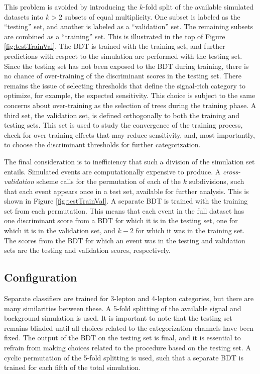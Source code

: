 This problem is avoided by introducing the $k$-fold split of the available simulated datasets into $k>2$ subsets of equal multiplicity.
One subset is labeled as the ``testing'' set, and another is labeled as a ``validation'' set.
The remaining subsets are combined as a ``training'' set.
This is illustrated in the top of Figure \ref{fig:testTrainVal}.
The BDT is trained with the training set, and further predictions with respect to the simulation are performed with the testing set.
Since the testing set has not been exposed to the BDT during training, there is no chance of over-training of the discriminant scores in the testing set.
There remains the issue of selecting thresholds that define the signal-rich category to optimize, for example, the expected sensitivity.
This choice is subject to the same concerns about over-training as the selection of trees during the training phase. 
A third set, the validation set, is defined orthogonally to both the training and testing sets.
This set is used to study the convergence of the training process, check for over-training effects that may reduce sensitivity, and, most importantly, to choose the discriminant thresholds for further categorization.

The final consideration is to inefficiency that such a division of the simulation set entails.
Simulated events are computationally expensive to produce.
A \emph{cross-validation} scheme calls for the permutation of each of the $k$ subdivisions, such that each event appears once in a test set, available for further analysis.
This is shown in Figure \ref{fig:testTrainVal}.
A separate BDT is trained with the training set from each permutation.
This means that each event in the full dataset has one discriminant score from a BDT for which it is in the testing set, one for which it is in the validation set, and $k-2$ for which it was in the training set.
The scores from the BDT for which an event was in the testing and validation sets are the testing and validation scores, respectively.

\subsection{Configuration}
\label{sec:hmmBdtConfiguration}

Separate classifiers are trained for 3-lepton and 4-lepton categories, but there are many similarities between these.
A 5-fold splitting of the available signal and background simulation is used.
It is important to note that the testing set remains blinded until all choices related to the categorization channels have been fixed.
The output of the BDT on the testing set is final, and it is essential to refrain from making choices related to the procedure based on the testing set.
A cyclic permutation of the 5-fold splitting is used, such that a separate BDT is trained for each fifth of the total simulation.

